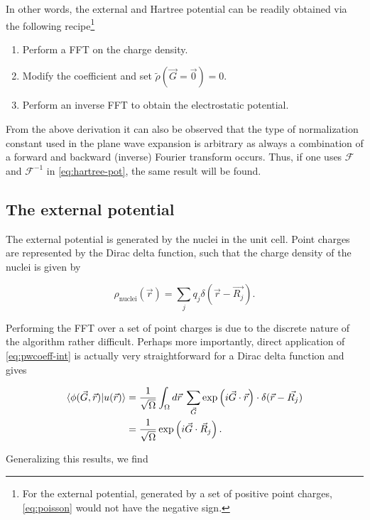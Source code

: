 In other words, the external and Hartree potential can be readily obtained via the following recipe\footnote{For the external potential, generated by a set of positive point charges, \cref{eq:poisson} would not have the negative sign.} 

\begin{enumerate}
    \item Perform a FFT on the charge density.
    \item Modify the coefficient and set $\tilde{\rho}(\vec{G} = \vec{0}) = 0$.
    \item Perform an inverse FFT to obtain the electrostatic potential.
\end{enumerate}

From the above derivation it can also be observed that the type of normalization constant used in the plane wave expansion is arbitrary as always a combination of a forward and backward (inverse) Fourier transform occurs. Thus, if one uses $\mathcal{F}$ and $\mathcal{F}^{-1}$ in \cref{eq:hartree-pot}, the same result will be found.

%
%
%
\subsection{The external potential}

The external potential is generated by the nuclei in the unit cell. Point charges are represented by the Dirac delta function, such that the charge density of the nuclei is given by

\begin{equation}
    \rho_{\text{nuclei}}(\vec{r}) = \sum_{j} q_{j} \delta(\vec{r} - \vec{R_{j}}).
\end{equation}

Performing the FFT over a set of point charges is due to the discrete nature of the algorithm rather difficult. Perhaps more importantly, direct application of \cref{eq:pwcoeff-int} is actually very straightforward for a Dirac delta function and gives

\begin{align}
    \braket{\phi(\vec{G},\vec{r}) | u(\vec{r})} &= \frac{1}{\sqrt{\Omega}} \int_{\Omega} d\vec{r} \; \sum_{\vec{G}} \exp \left(i\vec{G} \cdot \vec{r} \right) \cdot \delta(\vec{r} - \vec{R_{j}}) \\
    &= \frac{1}{\sqrt{\Omega}} \exp \left(i \vec{G} \cdot \vec{R}_{j} \right).
\end{align}

Generalizing this results, we find

